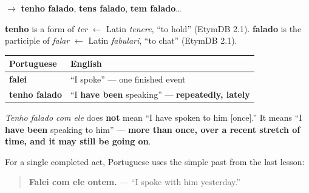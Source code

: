 $\to$ \textbf{tenho falado}, \textbf{tens falado}, \textbf{tem falado}…

\begin{cousinweb}
\textbf{tenho} is a form of \emph{ter} $\leftarrow$ Latin \emph{tenere}, \textquotedblleft{}to hold\textquotedblright{} (EtymDB 2.1). \textbf{falado} is the participle of \emph{falar} $\leftarrow$ Latin \emph{fabulari}, \textquotedblleft{}to chat\textquotedblright{} (EtymDB 2.1).
\end{cousinweb}

\begin{grammarlens}[title={Grammar Lens: What it actually means}]
\noindent
\begin{tabularx}{\linewidth}{@{}>{\raggedright\arraybackslash}X>{\raggedright\arraybackslash}X@{}}
\toprule
\textbf{Portuguese} & \textbf{English} \\
\midrule
\textbf{falei} & \textquotedblleft{}I spoke\textquotedblright{} — one finished event \\
\textbf{tenho falado} & \textquotedblleft{}I \textbf{have been} speaking\textquotedblright{} — \textbf{repeatedly, lately} \\
\bottomrule
\end{tabularx}

\emph{Tenho falado com ele} does \textbf{not} mean \textquotedblleft{}I have spoken to him {[}once{]}.\textquotedblright{} It means \textquotedblleft{}I \textbf{have been} speaking to him\textquotedblright{} — \textbf{more than once, over a recent stretch of time, and it may still be going on}.

For a single completed act, Portuguese uses the simple past from the last lesson:

\begin{quote}
\textbf{Falei com ele ontem.} — \textquotedblleft{}I spoke with him yesterday.\textquotedblright{}
\end{quote}
\end{grammarlens}

